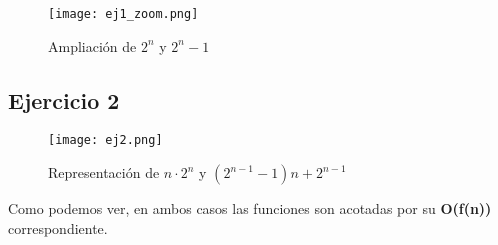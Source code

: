 \documentclass[12pt,spanish]{article}
\begin{document}
\begin{figure}[H]
\centering
\texttt{[image: ej1\_zoom.png]}
\caption{Ampliación de $2^{n}$ y $2^{n}-1$}
\end{figure}

\subsection{Ejercicio 2}

\begin{figure}[H]
\centering
\texttt{[image: ej2.png]}
\caption{Representación de $n \cdot 2^{n}$ y $(2^{n-1}-1)n +2^{n-1}$}
\end{figure}

\begin{center}
Como podemos ver, en ambos casos las funciones son acotadas por su \textbf{O(f(n))} correspondiente.
\end{center}
\end{document}
